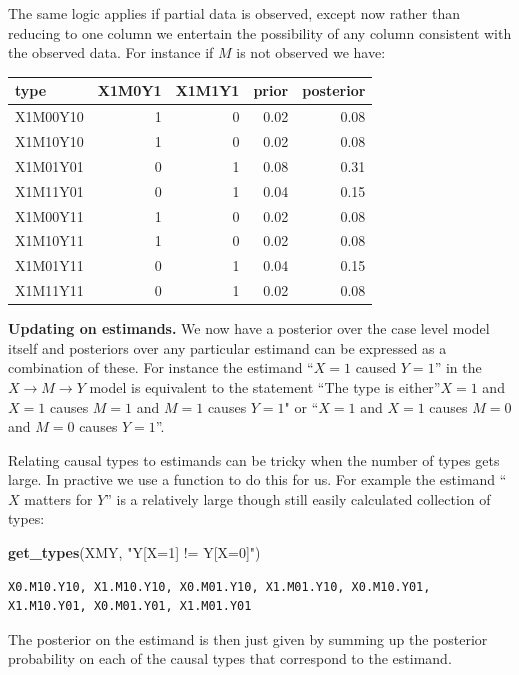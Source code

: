 \documentclass[12pt,]{book}
\newenvironment{Shaded}{\begin{snugshade}}{\end{snugshade}}
\newcommand{\KeywordTok}[1]{\textcolor[rgb]{0.13,0.29,0.53}{\textbf{#1}}}
\newcommand{\NormalTok}[1]{#1}
\newcommand{\StringTok}[1]{\textcolor[rgb]{0.31,0.60,0.02}{#1}}
\begin{document}
The same logic applies if partial data is observed, except now rather than reducing to one column we entertain the possibility of any column consistent with the observed data. For instance if \(M\) is not observed we have:

\begin{tabular}{l|r|r|r|r}
\hline
type & X1M0Y1 & X1M1Y1 & prior & posterior\\
\hline
X1M00Y10 & 1 & 0 & 0.02 & 0.08\\
\hline
X1M10Y10 & 1 & 0 & 0.02 & 0.08\\
\hline
X1M01Y01 & 0 & 1 & 0.08 & 0.31\\
\hline
X1M11Y01 & 0 & 1 & 0.04 & 0.15\\
\hline
X1M00Y11 & 1 & 0 & 0.02 & 0.08\\
\hline
X1M10Y11 & 1 & 0 & 0.02 & 0.08\\
\hline
X1M01Y11 & 0 & 1 & 0.04 & 0.15\\
\hline
X1M11Y11 & 0 & 1 & 0.02 & 0.08\\
\hline
\end{tabular}

\textbf{Updating on estimands.} We now have a posterior over the case level model itself and posteriors over any particular estimand can be expressed as a combination of these. For instance the estimand ``\(X=1\) caused \(Y=1\)'' in the \(X \rightarrow M \rightarrow Y\) model is equivalent to the statement ``The type is either''\(X=1\) and \(X=1\) causes \(M=1\) and \(M=1\) causes \(Y=1\)" or ``\(X=1\) and \(X=1\) causes \(M=0\) and \(M=0\) causes \(Y=1\)''.

Relating causal types to estimands can be tricky when the number of types gets large. In practive we use a function to do this for us. For example the estimand ``\(X\) matters for \(Y\)'' is a relatively large though still easily calculated collection of types:

\begin{Shaded}
\begin{Highlighting}[]
\KeywordTok{get_types}\NormalTok{(XMY, }\StringTok{"Y[X=1] != Y[X=0]"}\NormalTok{)}
\end{Highlighting}
\end{Shaded}

\begin{verbatim}
X0.M10.Y10, X1.M10.Y10, X0.M01.Y10, X1.M01.Y10, X0.M10.Y01, X1.M10.Y01, X0.M01.Y01, X1.M01.Y01
\end{verbatim}

The posterior on the estimand is then just given by summing up the posterior probability on each of the causal types that correspond to the estimand.
\end{document}
